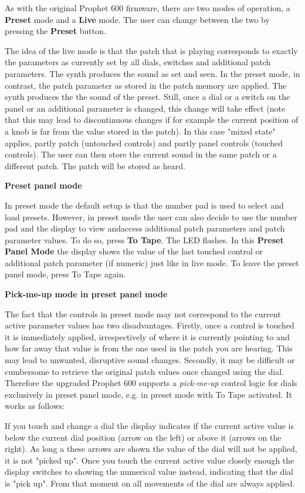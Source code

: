As with the original Prophet 600 firmware, there are two modes of operation, a \textbf{Preset} mode and a \textbf{Live} mode. The user can change between the two by pressing the \textbf{Preset} button. 

The idea of the live mode is that the patch that is playing corresponds to exactly the parameters as currently set by all dials, switches and additional patch parameters. The synth produces the sound as set and seen. In the preset mode, in contrast, the patch parameter as stored in the patch memory are applied. The synth produces the the sound of the preset. Still, once a dial or a switch on the panel or an additional parameter is changed, this change will take effect (note that this may lead to discontinuous changes if for example the current position of a knob is far from the  value stored in the patch). In this case  "mixed state" applies, partly patch (untouched controls) and partly panel controls (touched controls). The user can then store the current sound in the same patch or a different patch. The patch will be stored as heard. 

\textbf{Preset panel mode}

In preset mode the default setup is that the number pad is used to select and load presets. However, in preset mode the user can also decide to use the number pad and the display to view andaccess  additional patch parameters and patch parameter values. To do so, press \textbf{To Tape}. The LED flashes. In this \textbf{Preset Panel Mode} the display shows the value of the last touched control or additional patch parameter (if numeric) just like in live mode. To leave the preset panel mode, press To Tape again. 

\textbf{Pick-me-up mode in preset panel mode}

The fact that the controls in preset mode may not correspond to the current active parameter values has two disadvantages. Firstly, once a control is touched it is immediately applied, irrespectively of where it is currently pointing to and how far away that value is from the one used in the patch you are hearing. This may lead to unwanted, disruptive sound changes. Secondly, it may be difficult or cumbersome to retrieve the original patch values once changed using the dial. Therefore the upgraded Prophet 600 supports a \textit{pick-me-up} control logic for dials exclusively in preset panel mode, e.g. in preset mode with To Tape activated. It works as follows:

If you touch and change a dial the display indicates if the current active value is below the current dial position (arrow on the left) or above it (arrows on the right). As long a these arrows are shown the value of the dial will not be applied, it is not "picked up". Once you touch the current active value closely enough the display switches to showing the numerical value instead, indicating that the dial is "pick up". From that moment on all movements of the dial are always applied.

